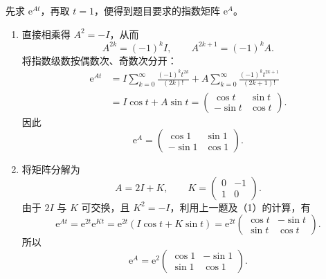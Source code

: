 \documentclass[UTF8,a4paper,11pt]{ctexart}
\newcommand{\e}{\mathrm e}
\begin{document}
\begin{solution}
先求 $\e^{At}$，再取 $t=1$，便得到题目要求的指数矩阵 $\e^A$。

\begin{enumerate}[label=(\arabic*)]
\item 直接相乘得 $A^2=-I$，从而
\[
A^{2k}=(-1)^kI,\qquad A^{2k+1}=(-1)^kA.
\]
将指数级数按偶数次、奇数次分开：
\[
\begin{aligned}
\e^{At}
&=I\sum_{k=0}^{\infty}\frac{(-1)^kt^{2k}}{(2k)!}
+A\sum_{k=0}^{\infty}\frac{(-1)^kt^{2k+1}}{(2k+1)!}\\
&=I\cos t+A\sin t
=\begin{pmatrix}\cos t&\sin t\\-\sin t&\cos t\end{pmatrix}.
\end{aligned}
\]
因此
\[
\boxed{\e^A=\begin{pmatrix}\cos1&\sin1\\-\sin1&\cos1\end{pmatrix}.}
\]

\item 将矩阵分解为
\[
A=2I+K,\qquad K=\begin{pmatrix}0&-1\\1&0\end{pmatrix}.
\]
由于 $2I$ 与 $K$ 可交换，且 $K^2=-I$，利用上一题及（1）的计算，有
\[
\e^{At}=\e^{2t}\e^{Kt}
=\e^{2t}(I\cos t+K\sin t)
=\e^{2t}\begin{pmatrix}\cos t&-\sin t\\\sin t&\cos t\end{pmatrix}.
\]
所以
\[
\boxed{\e^A=\e^2\begin{pmatrix}\cos1&-\sin1\\\sin1&\cos1\end{pmatrix}.}
\]


\end{enumerate}
\end{solution}
\end{document}
